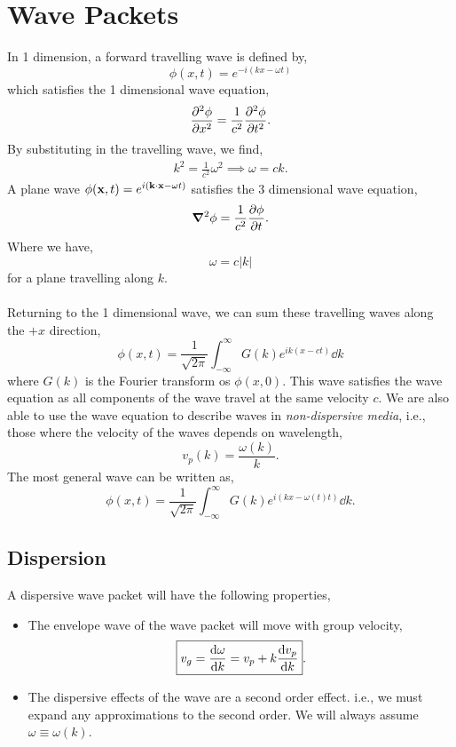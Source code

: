 \documentclass{book}
\begin{document}
\section{Wave Packets}
In 1 dimension, a forward travelling wave is defined by,
\begin{equation}
	\phi(x,t) = e^{-i\left(kx - \omega t\right)}
\end{equation}
which satisfies the 1 dimensional wave equation,
\begin{equation}
	\pdv[2]{\phi}{x} = \frac{1}{c^2}\pdv[2]{\phi}{t}.
\end{equation}
By substituting in the travelling wave, we find,
\begin{align}
	k^2 = \frac{1}{c^2}\omega^2 \implies \omega = ck. 
\end{align}
A plane wave $\phi(\vb{x},t) = e^{i(\vb{k}\cdot\vb{x} - \omega t)}$ satisfies the 3 dimensional wave equation,
\begin{equation}
	\grad^2\phi = \frac{1}{c^2}\pdv{\phi}{t}.
\end{equation}
Where we have,
\begin{equation}
	\omega = c|k|
\end{equation}
for a plane travelling along $k$.
\\\\
Returning to the 1 dimensional wave, we can sum these travelling waves along the $+x$ direction,
\begin{equation}
	\phi(x,t) = \frac{1}{\sqrt{2\pi}}\int_{-\infty}^{\infty}G(k)e^{ik(x-ct)}\dd{k}
\end{equation}
where $G(k)$ is the Fourier transform os $\phi(x,0)$. This wave satisfies the wave equation as all components of the wave travel at the same velocity $c$. We are also able to use the wave equation to describe waves in \textit{non-dispersive media}, i.e., those where the velocity of the waves depends on wavelength,
\begin{equation}
	v_p(k) = \frac{\omega(k)}{k}.
\end{equation}
The most general wave can be written as,
\begin{equation}
	\boxed{\phi(x,t) = \frac{1}{\sqrt{2\pi}}\int_{-\infty}^{\infty}G(k)e^{i(kx - \omega(t)t)}\dd{k}}.
\end{equation}
\subsection{Dispersion}
A dispersive wave packet will have the following properties,
\begin{itemize}
	\item The envelope wave of the wave packet will move with group velocity,
	\begin{equation}
		\boxed{v_g = \dv{\omega}{k} = v_p + k\dv{v_p}{k}}.
	\end{equation}
	\item The dispersive effects of the wave are a second order effect. i.e., we must expand any approximations to the second order. We will always assume $\omega \equiv \omega(k)$.
\end{itemize}
\end{document}
